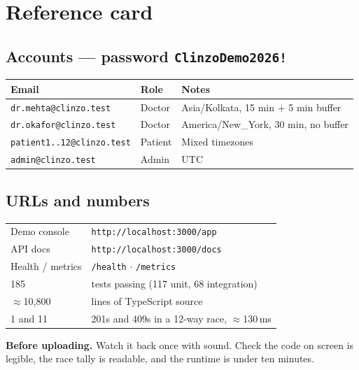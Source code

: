 \documentclass[11pt,a4paper]{article}
\begin{document}
\section{Reference card}

\subsection*{Accounts --- password \texttt{ClinzoDemo2026!}}

\begin{longtable}{@{}p{5.6cm} p{2.2cm} p{6.6cm}@{}}
\toprule
\textbf{Email} & \textbf{Role} & \textbf{Notes} \\
\midrule
\endhead
\texttt{dr.mehta@clinzo.test}     & Doctor  & Asia/Kolkata, 15 min + 5 min buffer \\
\texttt{dr.okafor@clinzo.test}    & Doctor  & America/New\_York, 30 min, no buffer \\
\texttt{patient1..12@clinzo.test} & Patient & Mixed timezones \\
\texttt{admin@clinzo.test}        & Admin   & UTC \\
\bottomrule
\end{longtable}

\subsection*{URLs and numbers}

\begin{longtable}{@{}p{5.6cm} p{9.4cm}@{}}
\toprule
Demo console        & \texttt{http://localhost:3000/app} \\
API docs            & \texttt{http://localhost:3000/docs} \\
Health / metrics    & \texttt{/health} $\cdot$ \texttt{/metrics} \\
\midrule
185                 & tests passing (117 unit, 68 integration) \\
$\approx$10{,}800   & lines of TypeScript source \\
1 and 11            & 201s and 409s in a 12-way race, $\approx$130\,ms \\
\bottomrule
\end{longtable}

\vspace{8pt}
\begin{note}
\textbf{Before uploading.} Watch it back once with sound. Check the code on
screen is legible, the race tally is readable, and the runtime is under ten
minutes.
\end{note}
\end{document}
